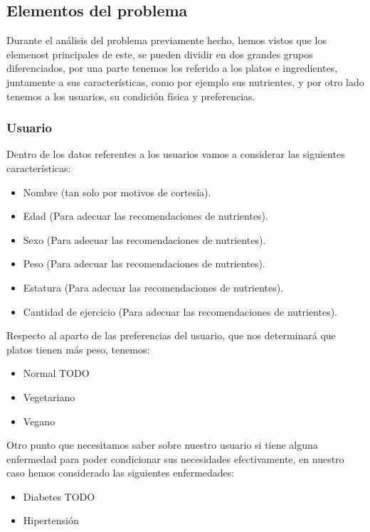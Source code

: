 \documentclass[11pt]{article}
\begin{document}
\subsection{Elementos del problema}

Durante el análisis del problema previamente hecho, hemos vistos que los elemenost principales de este, se pueden dividir en dos grandes grupos diferenciados, por una parte tenemos los referido a los platos e ingredientes, juntamente a sus características, como por ejemplo sus nutrientes, y por otro lado tenemos a los usuarios, su condición física y preferencias.

\subsubsection{Usuario}

Dentro de los datos referentes a los usuarios vamos a considerar las siguientes características:
\begin{itemize}
    \item Nombre (tan solo por motivos de cortesía).
    \item Edad (Para adecuar las recomendaciones de nutrientes).
    \item Sexo (Para adecuar las recomendaciones de nutrientes).
    \item Peso (Para adecuar las recomendaciones de nutrientes).
    \item Estatura (Para adecuar las recomendaciones de nutrientes).
    \item Cantidad de ejercicio (Para adecuar las recomendaciones de nutrientes).
\end{itemize}

Respecto al aparto de las preferencias del usuario, que nos determinará que platos tienen más peso, tenemos:
\begin{itemize}
    \item Normal TODO
    \item Vegetariano
    \item Vegano
\end{itemize}

Otro punto que necesitamos saber sobre nuestro usuario si tiene alguna enfermedad para poder condicionar sus necesidades efectivamente, en nuestro caso hemos considerado las siguientes enfermedades:
\begin{itemize}
    \item Diabetes TODO
    \item Hipertensión
\end{itemize}
\end{document}
